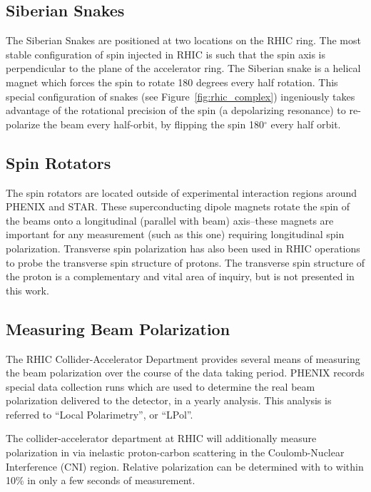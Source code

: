 \subsection{Siberian Snakes}
\label{sec:siberian_snakes}

The Siberian Snakes are positioned at two locations on the RHIC ring. The most
stable configuration of spin injected in RHIC is such that the spin axis is
perpendicular to the plane of the accelerator ring. The Siberian snake is a
helical magnet which forces the spin to rotate 180 degrees every half rotation.
This special configuration of snakes (see Figure~\ref{fig:rhic_complex})
ingeniously takes advantage of the rotational precision of the spin (a
depolarizing resonance) to re-polarize the beam every half-orbit, by flipping
the spin 180$^\circ$ every half orbit.

\subsection{Spin Rotators}

The spin rotators are located outside of experimental interaction regions around
PHENIX and STAR. These superconducting dipole magnets rotate the spin of the
beams onto a longitudinal (parallel with beam) axis--these magnets are important
for any measurement (such as this one) requiring longitudinal spin polarization.
Transverse spin polarization has also been used in RHIC operations to probe the
transverse spin structure of protons. The transverse spin structure of the
proton is a complementary and vital area of inquiry, but is not presented in
this work. 

\subsection{Measuring Beam Polarization}

The RHIC Collider-Accelerator Department provides several means of measuring the
beam polarization over the course of the data taking period. PHENIX records
special data collection runs which are used to determine the real beam
polarization delivered to the detector, in a yearly analysis. This analysis is
referred to ``Local Polarimetry'', or ``LPol''.

The collider-accelerator department at RHIC will additionally measure
polarization in via inelastic proton-carbon scattering in the Coulomb-Nuclear
Interference (CNI) region. Relative polarization can be determined with to
within 10\% in only a few seconds of measurement. 

